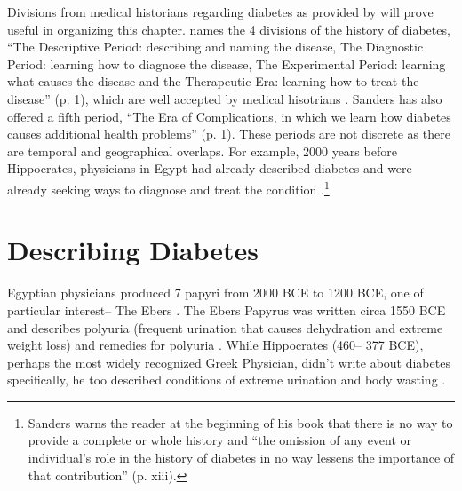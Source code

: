 \documentclass[12pt]{article}
\begin{document}
Divisions from medical historians regarding diabetes as provided by \citet{sanders_2001_philatelic} will prove useful in organizing this chapter. \citet{sanders_2001_philatelic} names the 4 divisions of the history of diabetes, ``The Descriptive Period: describing and naming the disease, The Diagnostic Period: learning how to diagnose the disease, The Experimental Period: learning what causes the disease and the Therapeutic Era: learning how to treat the disease'' (p. 1), which are well accepted by medical hisotrians \citep{papaspyros_1964_history}. Sanders has also offered a fifth period, ``The Era of Complications, in which we learn how diabetes causes additional health problems'' (p. 1). These periods are not discrete as there are temporal and geographical overlaps. For example, 2000 years before Hippocrates, physicians in Egypt had already described diabetes and were already seeking ways to diagnose and treat the condition \citep{sanders_2001_philatelic}.\footnote{Sanders warns the reader at the beginning of his book that there is no way to provide a complete or whole history and ``the omission of any event or individual's role in the history of diabetes in no way lessens the importance of that contribution'' (p. xiii). } 

\section{Describing Diabetes}

Egyptian physicians produced 7 papyri from 2000 BCE to 1200 BCE, one of particular interest-- The Ebers \citep{bryan_1974_ancient}. The Ebers Papyrus was written circa 1550 BCE and describes polyuria (frequent urination that causes dehydration and extreme weight loss) and remedies for polyuria \citep{bryan_1974_ancient}. 
While Hippocrates (460-- 377 BCE), perhaps the most widely recognized Greek Physician, didn't write about diabetes specifically, he too described conditions of extreme urination and body wasting \citep{avicenna_1930_treatise}. 
\end{document}
